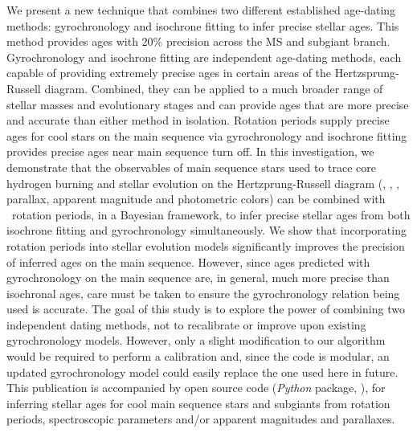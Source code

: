 We present a new technique that combines two different established age-dating
methods: gyrochronology and isochrone fitting to infer precise stellar ages.
This method provides ages with 20\% precision across the MS and subgiant
branch.
Gyrochronology and isochrone fitting are independent age-dating methods, each
capable of providing extremely precise ages in certain areas of the
Hertzsprung-Russell diagram.
Combined, they can be applied to a much broader range of stellar masses and
evolutionary stages and can provide ages that are more precise and accurate
than either method in isolation.
Rotation periods supply precise ages for cool stars on the main sequence via
gyrochronology and isochrone fitting provides precise ages near main sequence
turn off.
In this investigation, we demonstrate that the observables of main sequence
stars used to trace core hydrogen burning and stellar evolution on the
Hertzprung-Russell diagram (\teff, \feh, \logg, parallax, apparent magnitude
and photometric colors) can be combined with \kepler\ rotation periods, in a
Bayesian framework, to infer precise stellar ages from both isochrone fitting
and gyrochronology simultaneously.
We show that incorporating rotation periods into stellar evolution models
significantly improves the precision of inferred ages on the main sequence.
However, since ages predicted with gyrochronology on the main sequence are, in
general, much more precise than isochronal ages, care must be taken to ensure
the gyrochronology relation being used is accurate.
The goal of this study is to explore the power of combining two independent
dating methods, not to recalibrate or improve upon existing gyrochronology
models.
However, only a slight modification to our algorithm would be required to
perform a calibration and, since the code is modular, an updated
gyrochronology model could easily replace the one used here in future.
This publication is accompanied by open source code ({\it Python} package,
\sd), for inferring stellar ages for cool main sequence stars and subgiants
from rotation periods, spectroscopic parameters and/or apparent magnitudes and
parallaxes.
